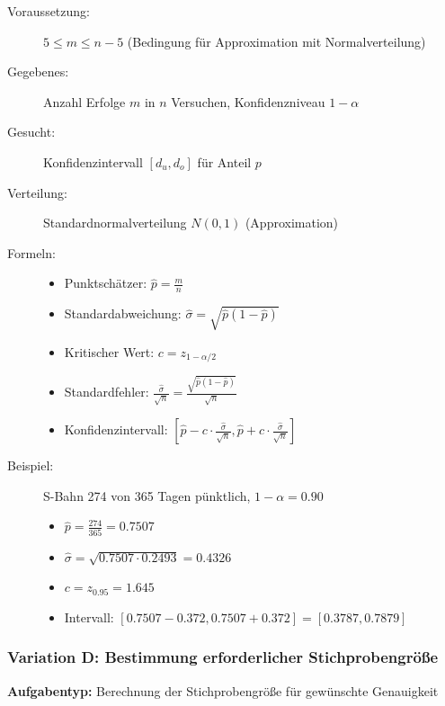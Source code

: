 \documentclass[12pt, a4paper, titlepage, ngerman]{scrartcl}
\begin{document}
\begin{description}
  \item[Voraussetzung:] $5 \leq m \leq n - 5$ (Bedingung für Approximation mit Normalverteilung)
  \item[Gegebenes:] Anzahl Erfolge $m$ in $n$ Versuchen, Konfidenzniveau $1 - \alpha$
  \item[Gesucht:] Konfidenzintervall $[d_u, d_o]$ für Anteil $p$
  \item[Verteilung:] Standardnormalverteilung $N(0,1)$ (Approximation)
  \item[Formeln:] 
    \begin{itemize}
      \item Punktschätzer: $\hat{p} = \frac{m}{n}$
      \item Standardabweichung: $\hat{\sigma} = \sqrt{\hat{p}(1 - \hat{p})}$
      \item Kritischer Wert: $c = z_{1 - \alpha/2}$
      \item Standardfehler: $\frac{\hat{\sigma}}{\sqrt{n}} = \frac{\sqrt{\hat{p}(1 - \hat{p})}}{\sqrt{n}}$
      \item Konfidenzintervall: $\left[\hat{p} - c \cdot \frac{\hat{\sigma}}{\sqrt{n}}, \hat{p} + c \cdot \frac{\hat{\sigma}}{\sqrt{n}}\right]$
    \end{itemize}
  \item[Beispiel:] S-Bahn 274 von 365 Tagen pünktlich, $1 - \alpha = 0.90$
    \begin{itemize}
      \item $\hat{p} = \frac{274}{365} = 0.7507$
      \item $\hat{\sigma} = \sqrt{0.7507 \cdot 0.2493} = 0.4326$
      \item $c = z_{0.95} = 1.645$
      \item Intervall: $[0.7507 - 0.372, 0.7507 + 0.372] = [0.3787, 0.7879]$
    \end{itemize}
\end{description}

\subsubsection{Variation D: Bestimmung erforderlicher Stichprobengröße}

\textbf{Aufgabentyp:} Berechnung der Stichprobengröße für gewünschte Genauigkeit
\end{document}
